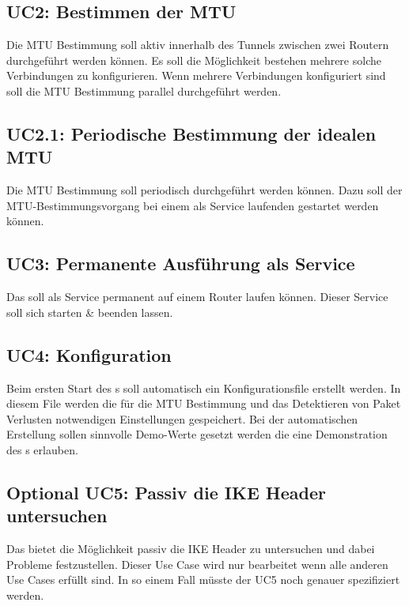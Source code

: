 \subsection{UC2: Bestimmen der MTU}
Die \ac{MTU} Bestimmung soll aktiv innerhalb des Tunnels zwischen zwei Routern durchgeführt werden können. Es soll die Möglichkeit bestehen mehrere solche Verbindungen zu konfigurieren. Wenn mehrere Verbindungen konfiguriert sind soll die \ac{MTU} Bestimmung parallel durchgeführt werden. 

\subsection{UC2.1: Periodische Bestimmung der idealen MTU}
Die \ac{MTU} Bestimmung soll periodisch durchgeführt werden können. Dazu soll der \ac{MTU}-Bestimmungsvorgang bei einem als Service laufenden \tool{} gestartet werden können.

\subsection{UC3: Permanente Ausführung als Service}
Das \tool{} soll als Service permanent auf einem Router laufen können. Dieser Service soll sich starten \& beenden lassen.

\subsection{UC4: Konfiguration}
Beim ersten Start des \tool{}s soll automatisch ein Konfigurationsfile erstellt werden. In diesem File werden die für die \ac{MTU} Bestimmung und das Detektieren von Paket Verlusten notwendigen Einstellungen gespeichert. Bei der automatischen Erstellung sollen sinnvolle Demo-Werte gesetzt werden die eine Demonstration des \tool{}s erlauben.

\subsection{Optional UC5: Passiv die IKE Header untersuchen}
Das \tool bietet die Möglichkeit passiv die \ac{IKE} Header zu untersuchen und dabei Probleme festzustellen. Dieser Use Case wird nur bearbeitet wenn alle anderen Use Cases erfüllt sind. In so einem Fall müsste der UC5 noch genauer spezifiziert werden.